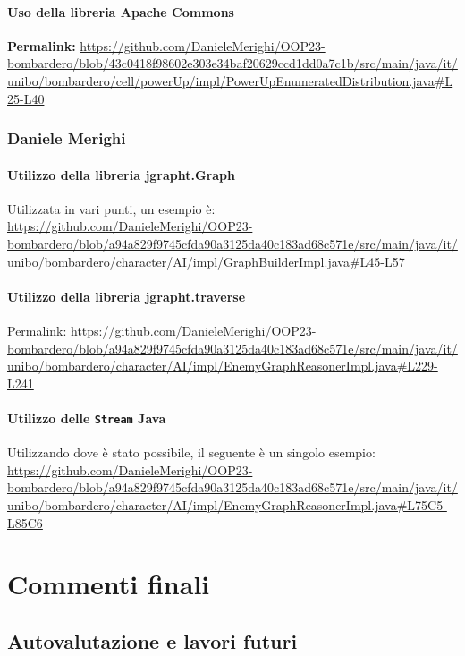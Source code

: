 \documentclass[a4paper,12pt]{report}
\begin{document}
\subsubsection{Uso della libreria Apache Commons}
\textbf{Permalink:} \url{https://github.com/DanieleMerighi/OOP23-bombardero/blob/43c0418f98602e303e34baf20629ccd1dd0a7c1b/src/main/java/it/unibo/bombardero/cell/powerUp/impl/PowerUpEnumeratedDistribution.java#L25-L40}




\subsection{Daniele Merighi}
\par
\subsubsection{Utilizzo della libreria jgrapht.Graph}
Utilizzata in vari punti, un esempio è:
\url{https://github.com/DanieleMerighi/OOP23-bombardero/blob/a94a829f9745cfda90a3125da40c183ad68c571e/src/main/java/it/unibo/bombardero/character/AI/impl/GraphBuilderImpl.java#L45-L57}

\par
\subsubsection{Utilizzo della libreria jgrapht.traverse}
Permalink: \url{https://github.com/DanieleMerighi/OOP23-bombardero/blob/a94a829f9745cfda90a3125da40c183ad68c571e/src/main/java/it/unibo/bombardero/character/AI/impl/EnemyGraphReasonerImpl.java#L229-L241}

\par
\subsubsection{Utilizzo delle \texttt{Stream} Java}
Utilizzando dove è stato possibile, il seguente è un singolo esempio: 
\url{https://github.com/DanieleMerighi/OOP23-bombardero/blob/a94a829f9745cfda90a3125da40c183ad68c571e/src/main/java/it/unibo/bombardero/character/AI/impl/EnemyGraphReasonerImpl.java#L75C5-L85C6}

\chapter{Commenti finali}

\section{Autovalutazione e lavori futuri}
\end{document}
